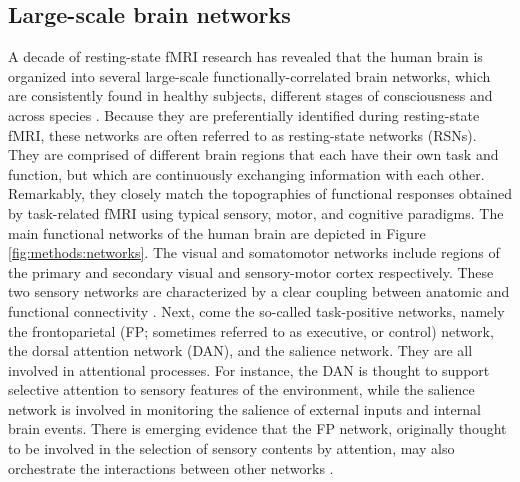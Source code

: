 \subsection{Large-scale brain networks}
\label{sec:fmri:fc:network}

A decade of resting-state fMRI research has revealed that the human brain is organized into several large-scale functionally-correlated brain networks, which are consistently found in healthy subjects, different stages of consciousness and across species \citep{fox_spontaneous_2007, yeo_organization_2011}. Because they are preferentially identified during resting-state fMRI, these networks are often referred to as resting-state networks (RSNs). They are comprised of different brain regions that each have their own task and function, but which are continuously exchanging information with each other. Remarkably, they closely match the topographies of functional responses obtained by task-related fMRI using typical sensory, motor, and cognitive paradigms.
The main functional networks of the human brain are depicted in Figure \ref{fig:methods:networks}. The visual and somatomotor networks include regions of the primary and secondary visual and sensory-motor cortex respectively. These two sensory networks are characterized by a clear coupling between anatomic and functional connectivity \citep{van_dijk_intrinsic_2010}. Next, come the so-called task-positive networks, namely the frontoparietal (FP; sometimes referred to as executive, or control) network, the dorsal attention network (DAN), and the salience network. They are all involved in attentional processes. For instance, the DAN is thought to support selective attention to sensory features of the environment, while the salience network is involved in monitoring the salience of external inputs and internal brain events. There is emerging evidence that the FP network, originally thought to be involved in the selection of sensory contents by attention, may also orchestrate the interactions between other networks \citep{christoff_mind-wandering_2016}.

